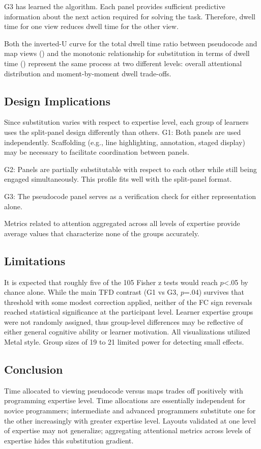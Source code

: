 \documentclass[journal]{vgtc}
\begin{document}
G3 has learned the algorithm. Each panel provides sufficient
predictive information about the next action required for solving
the task. Therefore, dwell time for one view reduces dwell time for
the other view.

Both the inverted-U curve for the total dwell time ratio between
pseudocode and map views () and the monotonic
relationship for substitution in terms of dwell time
() represent the same process at two different
levels: overall attentional distribution and moment-by-moment dwell
trade-offs.

\subsection{Design Implications}

Since substitution varies with respect to expertise level, each
group of learners uses the split-panel design differently than
others. G1: Both panels are used independently. Scaffolding (e.g.,
line highlighting, annotation, staged display) may be necessary to
facilitate coordination between panels.

G2: Panels are partially substitutable with respect to each other
while still being engaged simultaneously. This profile fits well
with the split-panel format.

G3: The pseudocode panel serves as a verification check for either
representation alone.

Metrics related to attention aggregated across all levels of
expertise provide average values that characterize none of the
groups accurately.

\subsection{Limitations}

It is expected that roughly five of the 105 Fisher z tests would
reach $p$<.05 by chance alone. While the main TFD contrast (G1 vs
G3, $p$=.04) survives that threshold with some modest correction
applied, neither of the FC sign reversals reached statistical
significance at the participant level. Learner expertise groups were
not randomly assigned, thus group-level differences may be reflective
of either general cognitive ability or learner motivation. All
visualizations utilized Metal style. Group sizes of 19 to 21 limited
power for detecting small effects.

\subsection{Conclusion}

Time allocated to viewing pseudocode versus maps trades off
positively with programming expertise level. Time allocations are
essentially independent for novice programmers; intermediate and
advanced programmers substitute one for the other increasingly with
greater expertise level. Layouts validated at one level of expertise
may not generalize; aggregating attentional metrics across levels of
expertise hides this substitution gradient.




\end{document}
